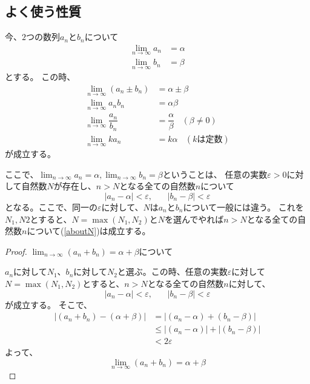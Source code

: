 \documentclass[a4paper,16pt]{jsarticle}
\newtheorem{proof}{証明}
\begin{document}
{\newpage

\subsection{よく使う性質}
今、$2$つの数列$a_n$と$b_n$について
\begin{align}
	\lim_{n \to \infty} a_n &= \alpha \\
	\lim_{n \to \infty} b_n &= \beta
\end{align}
とする。
この時、
\begin{align}
	\lim_{n \to \infty} (a_n \pm b_n) &= \alpha \pm \beta \\
	\lim_{n \to \infty} a_nb_n &= \alpha\beta \\
	\lim_{n \to \infty} \dfrac{a_n}{b_n} &= \dfrac{\alpha}{\beta}~~~~(\beta \neq 0)\\
	\lim_{n \to \infty} ka_n &= k\alpha~~~~(kは定数)
\end{align}
が成立する。

ここで、$\lim_{n \to \infty} a_n = \alpha,\lim_{n \to \infty} b_n = \beta$ということは、
任意の実数$\varepsilon>0$に対して自然数$N$が存在し、$n>N$となる全ての自然数$n$について
\begin{equation}
	\label{aboutN}
	|a_n - \alpha| < \varepsilon, ~~~~~~~~ |b_n - \beta| < \varepsilon
\end{equation}
となる。ここで、同一の$\varepsilon$に対して、$N$は$a_n$と$b_n$について一般には違う。
これを$N_1,N2$とすると、$N = \max(N_1,N_2)$と$N$を選んでやれば$n>N$となる全ての自然数$n$について(\ref{aboutN})は成立する。

\begin{proof}{$\lim_{n \to \infty} (a_n + b_n) = \alpha + \beta$について}

$a_n$に対して$N_1$、$b_n$に対して$N_2$と選ぶ。この時、任意の実数$\varepsilon$に対して$N = \max(N_1,N_2)$とすると、$n>N$となる全ての自然数$n$に対して、
\begin{equation}
	|a_n - \alpha| < \varepsilon, ~~~~~~~~ |b_n - \beta| < \varepsilon
\end{equation}
が成立する。
そこで、
\begin{align}
	|(a_n + b_n) - (\alpha + \beta)|
	&= |(a_n - \alpha) + (b_n - \beta)| \\
	&\leq |(a_n - \alpha)| + |(b_n - \beta)| \\
	&< 2\varepsilon
\end{align}
よって、
\begin{equation}
	\lim_{n \to \infty} (a_n + b_n) = \alpha + \beta
\end{equation}
\end{proof}

}
\end{document}
